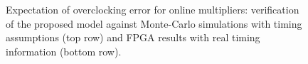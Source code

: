 \documentclass{acm_proc_article-sp}
\begin{document}
\begin{figure}[t]
{\begin{minipage}{0.24\textwidth}
  \end{minipage}
  }\vspace{-2ex}
  \vspace{-2ex}
  \caption{Expectation of overclocking error for online multipliers: verification of the proposed model against Monte-Carlo simulations with timing assumptions (top row) and FPGA results with real timing information (bottom row).}
  \label{Fig:ModelVerification}
  \vspace{-2ex}
\end{figure}
\end{document}
